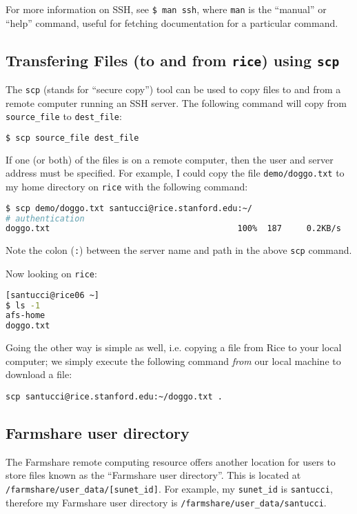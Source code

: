 \documentclass[12pt,letterpaper,twoside]{article}
\begin{document}
For more information on SSH, see \texttt{\$ man ssh}, where \texttt{man} is the ``manual'' or ``help'' 
command, useful for fetching documentation for a particular command.

\subsection{Transfering Files (to and from \texttt{rice}) using \texttt{scp}}

The \texttt{scp} (stands for ``secure copy'') tool can be used to copy files to and from
a remote computer running an SSH server.  The following command will copy from
\texttt{source\_file} to \texttt{dest\_file}:

\begin{lstlisting}[language=bash]
$ scp source_file dest_file
\end{lstlisting}

If one (or both) of the files is on a remote computer, then the user and server
address must be specified.  For example, I could copy the file \texttt{demo/doggo.txt}
to my home directory on \texttt{rice} with the following command:

\begin{lstlisting}[language=bash]
$ scp demo/doggo.txt santucci@rice.stanford.edu:~/
# authentication
doggo.txt                                      100%  187     0.2KB/s   00:00
\end{lstlisting}

Note the colon (\texttt{:}) between the server name and path in the above \texttt{scp}
command.

Now looking on \texttt{rice}:

\begin{lstlisting}[language=bash]
[santucci@rice06 ~]
$ ls -1
afs-home
doggo.txt
\end{lstlisting}

Going the other way is simple as well, i.e. copying a file from Rice to your local computer; we simply execute the following command \emph{from} our local machine to download a file:
\begin{lstlisting}
scp santucci@rice.stanford.edu:~/doggo.txt .
\end{lstlisting}

\subsection{Farmshare user directory}

The Farmshare remote computing resource offers another location for users to
store files known as the ``Farmshare user directory''.  This is located at
\texttt{/farmshare/user\_data/[sunet\_id]}.  For example, my \texttt{sunet\_id} is \texttt{santucci},
therefore my Farmshare user directory is \newline 
\texttt{/farmshare/user\_data/santucci}.
\end{document}
